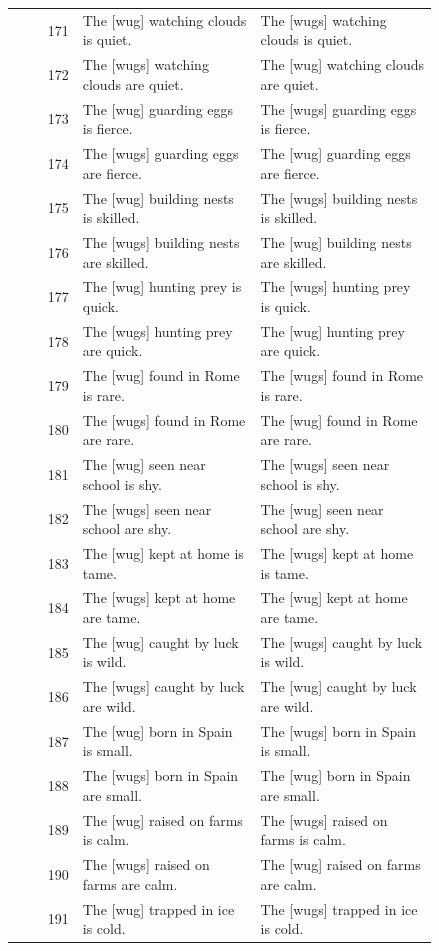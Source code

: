 \begin{longtable}{@{}rp{0.42\linewidth}p{0.42\linewidth}@{}}
171 & The {[}wug{]} watching clouds is quiet. & The {[}wugs{]} watching clouds is quiet. \\
172 & The {[}wugs{]} watching clouds are quiet. & The {[}wug{]} watching clouds are quiet. \\
173 & The {[}wug{]} guarding eggs is fierce. & The {[}wugs{]} guarding eggs is fierce. \\
174 & The {[}wugs{]} guarding eggs are fierce. & The {[}wug{]} guarding eggs are fierce. \\
175 & The {[}wug{]} building nests is skilled. & The {[}wugs{]} building nests is skilled. \\
176 & The {[}wugs{]} building nests are skilled. & The {[}wug{]} building nests are skilled. \\
177 & The {[}wug{]} hunting prey is quick. & The {[}wugs{]} hunting prey is quick. \\
178 & The {[}wugs{]} hunting prey are quick. & The {[}wug{]} hunting prey are quick. \\
179 & The {[}wug{]} found in Rome is rare. & The {[}wugs{]} found in Rome is rare. \\
180 & The {[}wugs{]} found in Rome are rare. & The {[}wug{]} found in Rome are rare. \\
181 & The {[}wug{]} seen near school is shy. & The {[}wugs{]} seen near school is shy. \\
182 & The {[}wugs{]} seen near school are shy. & The {[}wug{]} seen near school are shy. \\
183 & The {[}wug{]} kept at home is tame. & The {[}wugs{]} kept at home is tame. \\
184 & The {[}wugs{]} kept at home are tame. & The {[}wug{]} kept at home are tame. \\
185 & The {[}wug{]} caught by luck is wild. & The {[}wugs{]} caught by luck is wild. \\
186 & The {[}wugs{]} caught by luck are wild. & The {[}wug{]} caught by luck are wild. \\
187 & The {[}wug{]} born in Spain is small. & The {[}wugs{]} born in Spain is small. \\
188 & The {[}wugs{]} born in Spain are small. & The {[}wug{]} born in Spain are small. \\
189 & The {[}wug{]} raised on farms is calm. & The {[}wugs{]} raised on farms is calm. \\
190 & The {[}wugs{]} raised on farms are calm. & The {[}wug{]} raised on farms are calm. \\
191 & The {[}wug{]} trapped in ice is cold. & The {[}wugs{]} trapped in ice is cold. \\

\end{longtable}
